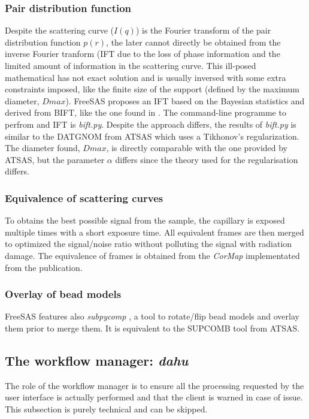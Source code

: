 \documentclass[preprint]{iucr}              %
\begin{document}
\subsubsection{Pair distribution function}
Despite the scattering curve ($I(q)$) is the Fourier transform of the pair distribution function $p(r)$, the later cannot directly be obtained from the
inverse Fourier tranform (IFT due to the loss of phase information and the limited amount of information in the scattering curve. 
This ill-posed mathematical has not exact solution and is usually inversed with some extra constraints imposed, like the finite size of the support (defined by the maximum diameter, $Dmax$).    
FreeSAS proposes an IFT based on the Bayesian statistics and derived from BIFT\cite{bift}, like the one found in \cite{bioxtasraw}.
The command-line programme to perfrom and IFT is \textit{bift.py}. 
Despite the approach differs, the results of \textit{bift.py} is similar to the DATGNOM\cite{ATSAS1} from ATSAS which uses a Tikhonov's regularization.
The diameter found, $Dmax$, is directly comparable with the one provided by ATSAS, but the parameter $\alpha$ differs since the theory used for the regularisation differs. 

\subsubsection{Equivalence of scattering curves}
To obtains the best possible signal from the sample, the capillary is exposed multiple times with a short exposure time.
All equivalent frames are then merged to optimized the signal/noise ratio without polluting the signal with radiation damage.  
The equivalence of frames is obtained from the \textit{CorMap} \cite{cormap} implementated from the publication. 

\subsubsection{Overlay of bead models}
FreeSAS features also \textit{subpycomp} \cite{BM29ODA}, a tool to rotate/flip bead models and overlay them prior to merge them. It is equivalent to the SUPCOMB\cite{supcomb} tool from ATSAS. 

\subsection{The workflow manager: \textit{dahu}}

The role of the workflow manager is to ensure all the processing requested by the user interface is actually performed and that the client is warned in case of issue.
This subsection is purely technical and can be skipped. 
\end{document}
